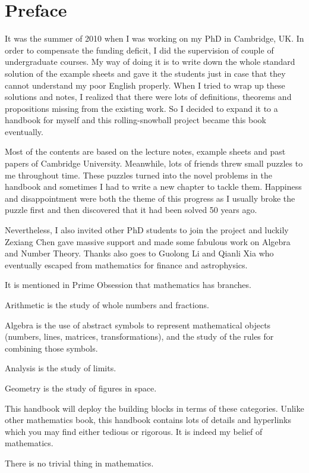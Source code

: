 
\chapter*{Preface}

It was the summer of 2010 when I was working on my PhD in Cambridge, UK. In order to compensate the funding deficit, I did the supervision of couple of undergraduate courses. My way of doing it is to write down the whole standard solution of the example sheets and gave it the students just in case that they cannot understand my poor English properly. When I tried to wrap up these solutions and notes, I realized that there were lots of definitions, theorems and propositions missing from the existing work. So I decided to expand it to a handbook for myself and this rolling-snowball project became this book eventually.

Most of the contents are based on the lecture notes, example sheets and past papers of Cambridge University. Meanwhile, lots of friends threw small puzzles to me throughout time. These puzzles turned into the novel problems in the handbook and sometimes I had to write a new chapter to tackle them. Happiness and disappointment were both the theme of this progress as I usually broke the puzzle first and then discovered that it had been solved 50 years ago.

Nevertheless, I also invited other PhD students to join the project and luckily Zexiang Chen gave massive support and made some fabulous work on Algebra and Number Theory. Thanks also goes to Guolong Li and Qianli Xia who eventually escaped from mathematics for finance and astrophysics.

It is mentioned in Prime Obsession that mathematics has branches.
\bit
\item Arithmetic is the study of whole numbers and fractions.
\item Algebra is the use of abstract symbols to represent mathematical objects (numbers, lines, matrices, transformations), and the study of the rules for combining those symbols.
\item Analysis is the study of limits.
\item Geometry is the study of figures in space.
\eit

This handbook will deploy the building blocks in terms of these categories. Unlike other mathematics book, this handbook contains lots of details and hyperlinks which you may find either tedious or rigorous. It is indeed my belief of mathematics.
\begin{center}
There is no trivial thing in mathematics.
\end{center}%


